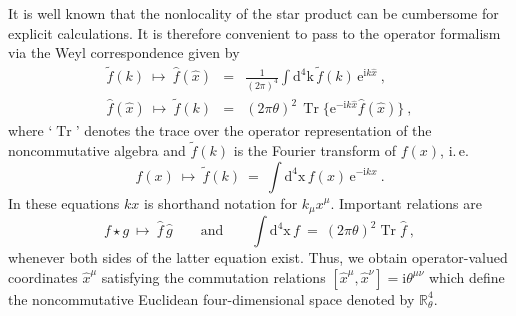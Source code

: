 \documentclass[a4paper,11pt,english]{article}
\numberwithin{equation}{section}
\newcommand{\D}[1]{\operatorname{d#1}}
\newcommand{\Tr}[1]{\operatorname{Tr #1}}
\newcommand{\ii}{\mbox{i}}
\newcommand{\e}{\mbox{e}}
\renewcommand{\=}{\ =\ }
\begin{document}
It is well known that the nonlocality of the star product can be cumbersome
for explicit calculations. It is therefore convenient to pass %
to the operator formalism via the Weyl correspondence given by
\begin{subequations}
\begin{eqnarray}
 \tilde{f}(k)\ \mapsto\ \hat{f}(\hat{x}) &=& \frac{1}{(2\pi)^4}\int\D{ ^4k}%
\,\tilde{f}(k)\,\e^{\ii k\hat{x}}\ ,\\
 \hat{f}(\hat{x})\ \mapsto\ \tilde{f}(k) &=& (2\pi\theta)^2\,
\Tr{}\bigl\{\e^{-\ii k\hat{x}}\hat{f}(\hat{x})\bigr\}\ ,
\end{eqnarray}
\end{subequations}
where `$\Tr{}$' denotes the trace over the operator representation of the %
 noncommutative algebra and $\tilde{f}(k)$ is the Fourier transform of $f%
(x)$, i.\,e.
\begin{equation}
 f(x)\ \mapsto\ \tilde{f}(k)\=\int\D{ ^4x}\,f(x)\,\e^{-\ii kx}\ .
\end{equation}
In these equations $kx$ is shorthand notation for $k_{\mu}x^{\mu}$. 
Important relations are
\begin{equation}
 f\star g\ \mapsto\ \hat{f}\,\hat{g}\qquad\text{and}\qquad\int\D{ ^4x}\,f\=(2%
\pi\theta)^2\Tr{}\hat{f}\ ,
\end{equation}
whenever both sides of the latter equation exist.
Thus, we obtain operator-valued coordinates $\hat{x}^\mu$ satisfying the %
commutation relations $[\hat{x}^\mu,\hat{x}^\nu]=\ii\theta^{\mu\nu}$ which
define the noncommutative Euclidean four-dimensional space denoted by %
 $\mathbb{R}^4_\theta$. 
\end{document}
